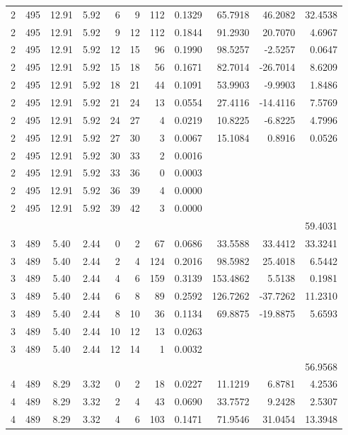 \documentclass{article}
\begin{document}
\begin{CJK}{UTF8}{song}
\begin{table}[tbp]
\begin{center}
\begin{threeparttable}[b]
\begin{tabular}{ccccrrrrrrr}
2 & 495 & 12.91 & 5.92 & 6 & 9 & 112 & 0.1329  & 65.7918  & 46.2082  & 32.4538 \\
2 & 495 & 12.91 & 5.92 & 9 & 12 & 112 & 0.1844  & 91.2930  & 20.7070  & 4.6967 \\
2 & 495 & 12.91 & 5.92 & 12 & 15 & 96 & 0.1990  & 98.5257  & -2.5257  & 0.0647 \\
2 & 495 & 12.91 & 5.92 & 15 & 18 & 56 & 0.1671  & 82.7014  & -26.7014  & 8.6209 \\
2 & 495 & 12.91 & 5.92 & 18 & 21 & 44 & 0.1091  & 53.9903  & -9.9903  & 1.8486 \\
2 & 495 & 12.91 & 5.92 & 21 & 24 & 13 & 0.0554  & 27.4116  & -14.4116  & 7.5769 \\
2 & 495 & 12.91 & 5.92 & 24 & 27 & 4 & 0.0219  & 10.8225  & -6.8225  & 4.7996 \\
2 & 495 & 12.91 & 5.92 & 27 & 30 & 3 & 0.0067  & 15.1084  & 0.8916  & 0.0526 \\
2 & 495 & 12.91 & 5.92 & 30 & 33 & 2 & 0.0016  &  &  & \\
2 & 495 & 12.91 & 5.92 & 33 & 36 & 0 & 0.0003  &  &  & \\
2 & 495 & 12.91 & 5.92 & 36 & 39 & 4 & 0.0000  &  &  & \\
2 & 495 & 12.91 & 5.92 & 39 & 42 & 3 & 0.0000  &  &  & \\
 &  &  &  &  &  &  &  &  &  & 59.4031 \\
  \midrule
3 & 489 & 5.40 & 2.44 & 0 & 2 & 67 & 0.0686  & 33.5588  & 33.4412  & 33.3241 \\
3 & 489 & 5.40 & 2.44 & 2 & 4 & 124 & 0.2016  & 98.5982  & 25.4018  & 6.5442 \\
3 & 489 & 5.40 & 2.44 & 4 & 6 & 159 & 0.3139  & 153.4862  & 5.5138  & 0.1981 \\
3 & 489 & 5.40 & 2.44 & 6 & 8 & 89 & 0.2592  & 126.7262  & -37.7262  & 11.2310 \\
3 & 489 & 5.40 & 2.44 & 8 & 10 & 36 & 0.1134  & 69.8875  & -19.8875  & 5.6593 \\
3 & 489 & 5.40 & 2.44 & 10 & 12 & 13 & 0.0263  &  &  & \\
3 & 489 & 5.40 & 2.44 & 12 & 14 & 1 & 0.0032  &  &  & \\
 &  &  &  &  &  &  &  &  &  & 56.9568 \\
  \midrule
4 & 489 & 8.29 & 3.32 & 0 & 2 & 18 & 0.0227  & 11.1219  & 6.8781  & 4.2536 \\
4 & 489 & 8.29 & 3.32 & 2 & 4 & 43 & 0.0690  & 33.7572  & 9.2428  & 2.5307 \\
4 & 489 & 8.29 & 3.32 & 4 & 6 & 103 & 0.1471  & 71.9546  & 31.0454  & 13.3948 \\

\end{tabular}
\end{threeparttable}
\end{center}
\end{table}
\end{CJK}
\end{document}
